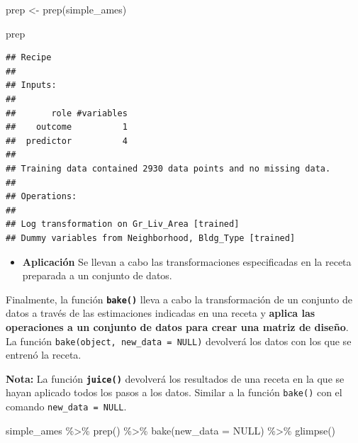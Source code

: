 \documentclass[
]{book}
\newenvironment{Shaded}{\begin{snugshade}}{\end{snugshade}}
\newcommand{\AttributeTok}[1]{\textcolor[rgb]{0.77,0.63,0.00}{#1}}
\newcommand{\ConstantTok}[1]{\textcolor[rgb]{0.00,0.00,0.00}{#1}}
\newcommand{\FunctionTok}[1]{\textcolor[rgb]{0.00,0.00,0.00}{#1}}
\newcommand{\NormalTok}[1]{#1}
\newcommand{\OtherTok}[1]{\textcolor[rgb]{0.56,0.35,0.01}{#1}}
\newcommand{\SpecialCharTok}[1]{\textcolor[rgb]{0.00,0.00,0.00}{#1}}
\providecommand{\tightlist}{%
  \setlength{\itemsep}{0pt}\setlength{\parskip}{0pt}}
\begin{document}
\begin{Shaded}
\begin{Highlighting}[]
\NormalTok{prep }\OtherTok{\textless{}{-}} \FunctionTok{prep}\NormalTok{(simple\_ames) }

\NormalTok{prep}
\end{Highlighting}
\end{Shaded}

\begin{verbatim}
## Recipe
## 
## Inputs:
## 
##       role #variables
##    outcome          1
##  predictor          4
## 
## Training data contained 2930 data points and no missing data.
## 
## Operations:
## 
## Log transformation on Gr_Liv_Area [trained]
## Dummy variables from Neighborhood, Bldg_Type [trained]
\end{verbatim}

\begin{itemize}
\tightlist
\item
  \textbf{Aplicación} Se llevan a cabo las transformaciones especificadas en la receta preparada a un conjunto de datos.
\end{itemize}

Finalmente, la función \textbf{\texttt{bake()}} lleva a cabo la transformación de un conjunto de datos a través de las estimaciones indicadas en una receta y \textbf{aplica las operaciones a un conjunto de datos para crear una matriz de diseño}. La función \texttt{bake(object,\ new\_data\ =\ NULL)} devolverá los datos con los que se entrenó la receta.

\textbf{Nota: } La función \textbf{\texttt{juice()}} devolverá los resultados de una receta en la que se hayan aplicado todos los pasos a los datos. Similar a la función \texttt{bake()} con el comando \texttt{new\_data\ =\ NULL}.

\begin{Shaded}
\begin{Highlighting}[]
\NormalTok{simple\_ames }\SpecialCharTok{\%\textgreater{}\%} 
  \FunctionTok{prep}\NormalTok{() }\SpecialCharTok{\%\textgreater{}\%} 
  \FunctionTok{bake}\NormalTok{(}\AttributeTok{new\_data =} \ConstantTok{NULL}\NormalTok{) }\SpecialCharTok{\%\textgreater{}\%} 
  \FunctionTok{glimpse}\NormalTok{()}
\end{Highlighting}
\end{Shaded}
\end{document}
